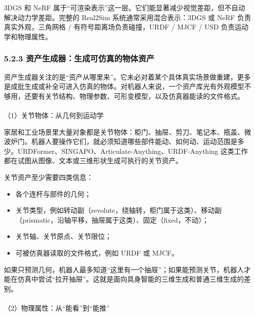 \documentclass[
  chinese,
]{ctexart}
\makeatletter
\let\oldparagraph\paragraph
\renewcommand{\paragraph}{
    \@ifstar
      \xxxParagraphStar
      \xxxParagraphNoStar
  }
\newcommand{\xxxParagraphStar}[1]{\oldparagraph*{#1}\mbox{}}
\newcommand{\xxxParagraphNoStar}[1]{\oldparagraph{#1}\mbox{}}
\providecommand{\tightlist}{%
  \setlength{\itemsep}{0pt}\setlength{\parskip}{0pt}}
\makeatother
\begin{document}
3DGS 和 NeRF
属于``可渲染表示''这一层。它们能显著减少视觉差距，但不自动解决动力学差距。完整的
Real2Sim 系统通常采用混合表示：3DGS 或 NeRF 负责真实外观，三角网格 /
有符号距离场负责碰撞，URDF / MJCF / USD 负责运动学和物理属性。

\subsubsection{5.2.3
资产生成器：生成可仿真的物体资产}\label{ux8d44ux4ea7ux751fux6210ux5668ux751fux6210ux53efux4effux771fux7684ux7269ux4f53ux8d44ux4ea7}

资产生成器关注的是``资产从哪里来''。它未必对着某个具体真实场景做重建，更多是成批生成或补全可进入仿真的物体。对机器人来说，一个资产库光有外观模型不够用，还要有关节结构、物理参数、可形变模型，以及仿真器能读的文件格式。

\paragraph{（1）关节物体：从几何到运动学}\label{ux5173ux8282ux7269ux4f53ux4eceux51e0ux4f55ux5230ux8fd0ux52a8ux5b66}

家居和工业场景里大量对象都是关节物体：柜门、抽屉、剪刀、笔记本、瓶盖、微波炉门。机器人要操作它们，就必须知道哪些部件能动、如何动、运动范围是多少。URDFormer、SINGAPO、Articulate-Anything、URDF-Anything
这类工作都在试图从图像、文本或三维形状生成可执行的关节资产。

关节资产至少需要四类信息：

\begin{itemize}
\tightlist
\item
  各个连杆与部件的几何；
\item
  关节类型，例如转动副（revolute，绕轴转，柜门属于这类）、移动副（prismatic，沿轴平移，抽屉属于这类）、固定（fixed，不动）；
\item
  关节轴、关节原点、关节限位；
\item
  可被仿真器读取的文件格式，例如 URDF 或 MJCF。
\end{itemize}

如果只预测几何，机器人最多知道``这里有一个抽屉''；如果能预测关节，机器人才能在仿真中尝试``拉开抽屉''。这就是面向具身智能的三维生成和普通三维生成的差别。

\paragraph{（2）物理属性：从``能看''到``能推''}\label{ux7269ux7406ux5c5eux6027ux4eceux80fdux770bux5230ux80fdux63a8}
\end{document}
